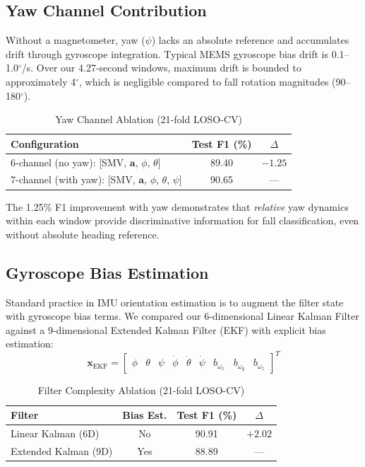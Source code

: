 \subsection{Yaw Channel Contribution}

Without a magnetometer, yaw ($\psi$) lacks an absolute reference and accumulates drift through gyroscope integration. Typical MEMS gyroscope bias drift is 0.1--1.0$^\circ$/s. Over our 4.27-second windows, maximum drift is bounded to approximately 4$^\circ$, which is negligible compared to fall rotation magnitudes (90--180$^\circ$).

\begin{table}[htbp]
\centering
\caption{Yaw Channel Ablation (21-fold LOSO-CV)}
\label{tab:yaw_ablation}
\begin{tabular}{@{}lcc@{}}
\toprule
\textbf{Configuration} & \textbf{Test F1 (\%)} & \textbf{$\Delta$} \\
\midrule
6-channel (no yaw): [SMV, $\mathbf{a}$, $\phi$, $\theta$] & 89.40 & $-1.25$ \\
7-channel (with yaw): [SMV, $\mathbf{a}$, $\phi$, $\theta$, $\psi$] & 90.65 & --- \\
\bottomrule
\end{tabular}
\end{table}

The 1.25\% F1 improvement with yaw demonstrates that \textit{relative} yaw dynamics within each window provide discriminative information for fall classification, even without absolute heading reference.

\subsection{Gyroscope Bias Estimation}

Standard practice in IMU orientation estimation is to augment the filter state with gyroscope bias terms. We compared our 6-dimensional Linear Kalman Filter against a 9-dimensional Extended Kalman Filter (EKF) with explicit bias estimation:
\begin{equation}
\mathbf{x}_{\text{EKF}} = \begin{bmatrix} \phi & \theta & \psi & \dot{\phi} & \dot{\theta} & \dot{\psi} & b_{\omega_x} & b_{\omega_y} & b_{\omega_z} \end{bmatrix}^T
\end{equation}

\begin{table}[htbp]
\centering
\caption{Filter Complexity Ablation (21-fold LOSO-CV)}
\label{tab:bias_ablation}
\begin{tabular}{@{}lccc@{}}
\toprule
\textbf{Filter} & \textbf{Bias Est.} & \textbf{Test F1 (\%)} & \textbf{$\Delta$} \\
\midrule
Linear Kalman (6D) & No & 90.91 & $+2.02$ \\
Extended Kalman (9D) & Yes & 88.89 & --- \\
\bottomrule
\end{tabular}
\end{table}

